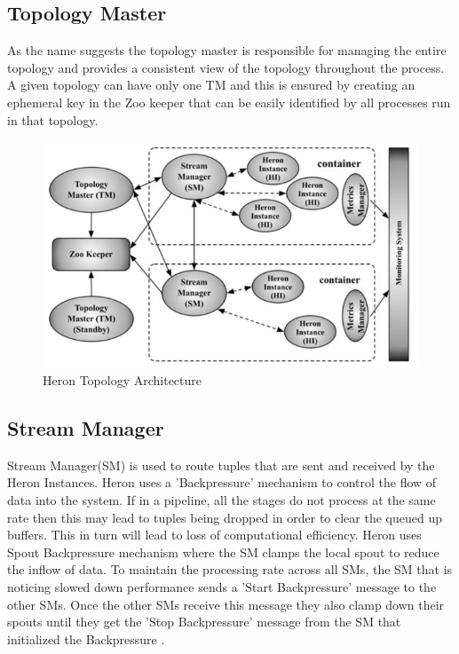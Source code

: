 \documentclass[9pt,twocolumn,twoside]{styles/osajnl}
\begin{document}
\subsection{Topology Master}
As the name suggests the topology master is responsible for managing the entire topology and provides a consistent view of the topology throughout the process. A given topology can have only one TM and this is ensured by creating an ephemeral key in the Zoo keeper that can be easily identified by all processes run in that topology. 
\begin{figure}[htbp]
\begin{center}
\centering
\includegraphics[width=\linewidth]{images/img2}
\caption{Heron Topology Architecture \cite{TwitterHeron2}}
\label{fig:false-color}
\end{center}
\end{figure}
\subsection{Stream Manager}
Stream Manager(SM) is used to route tuples that are sent and received by the Heron Instances. Heron uses a 'Backpressure' mechanism to control the flow of data into the system. If in a pipeline, all the stages do not process at the same rate then this may lead to tuples being dropped in order to clear the queued up buffers. This in turn will lead to loss of computational efficiency. Heron uses Spout Backpressure mechanism where the SM clamps the local spout to reduce the inflow of data. To maintain the processing rate across all SMs, the SM that is noticing slowed down performance sends a 'Start Backpressure' message to the other SMs. Once the other SMs receive this message they also clamp down their spouts until they get the 'Stop Backpressure' message from the SM that initialized the Backpressure \cite{TwitterHeron3}.
\end{document}
